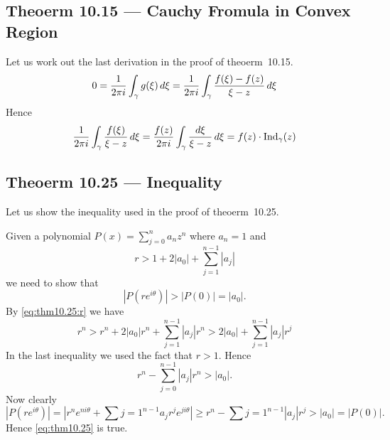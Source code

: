 \subsection{Theoerm 10.15 --- Cauchy Fromula in Convex Region}

Let us work out the last derivation in the proof of theoerm~10.15.
\begin{equation*}
0 = \frac{1}{2\pi i}\int_\gamma g(\xi)\,d\xi
= \frac{1}{2\pi i}\int_\gamma \frac{f(\xi)-f(z)}{\xi - z}\,d\xi
\end{equation*}
Hence
\begin{equation*}
\frac{1}{2\pi i}\int_\gamma \frac{f(\xi)}{\xi - z}\,d\xi
= \frac{f(z)}{2\pi i}\int_\gamma \frac{d\xi}{\xi - z}\,d\xi
= f(z)\cdot\mathop{\rm Ind}\nolimits_\gamma(z)
\end{equation*}


\subsection{Theoerm 10.25 --- Inequality}

Let us show the inequality used in the proof of theoerm~10.25.

Given a polynomial \(P(x) = \sum_{j=0}^n a_nz^n\) where \(a_n=1\)
and
\begin{equation} \label{eq:thm10.25:r}
r > 1 + 2|a_0| + \sum_{j=1}^{n-1} |a_j|
\end{equation}
we need to show that
\begin{equation} \label{eq:thm10.25}
\left| P(re^{i\theta})\right| > |P(0)| = |a_0|.
\end{equation}
By \eqref{eq:thm10.25:r} we have
\begin{equation*}
r^n
> r^n + 2|a_0|r^n + \sum_{j=1}^{n-1} |a_j|r^n
> 2|a_0| + \sum_{j=1}^{n-1} |a_j|r^j
\end{equation*}
In the last inequality we used the fact that \(r>1\).
Hence
\begin{equation*}
r^n - \sum_{j=0}^{n-1} |a_j|r^n > |a_0|.
\end{equation*}
Now clearly
\begin{equation*}
\left| P(re^{i\theta})\right|
= \left| r^ne^{ni\theta} + \sum{j=1}^{n-1} a_j r^j e^{ji\theta}\right|
\geq r^n - \sum{j=1}^{n-1} |a_j| r^j > |a_0| = |P(0)|.
\end{equation*}
Hence \eqref{eq:thm10.25} is true.

